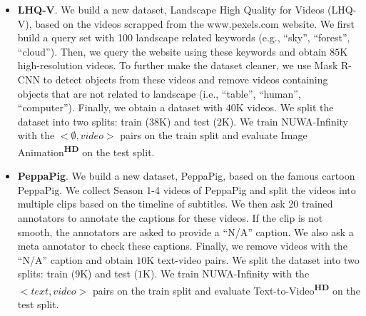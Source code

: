 \documentclass{article}
\begin{document}
\begin{itemize}[leftmargin=*]
\item \textbf{LHQ-V}. We build a new dataset, Landscape High Quality for Videos (LHQ-V), based on the videos scrapped from the www.pexels.com website. We first build a query set with 100 landscape related keywords (e.g., ``sky'', ``forest'', ``cloud''). Then, we query the website using these keywords and obtain $85$K high-resolution videos. To further make the dataset cleaner, we use Mask R-CNN \cite{heMaskRCNN2017} to detect objects from these videos and remove videos containing objects that are not related to landscape (i.e., ``table'', ``human'', ``computer''). Finally, we obtain a dataset with $40$K videos. We split the dataset into two splits: train ($38$K) and test ($2$K). We train NUWA-Infinity with the $<\emptyset, video>$ pairs on the train split and evaluate Image Animation\textsuperscript{\textbf{HD}} on the test split.

\item \textbf{PeppaPig}. We build a new dataset, PeppaPig, based on the famous cartoon PeppaPig. We collect Season 1-4 videos of PeppaPig and split the videos into multiple clips based on the timeline of subtitles. We then ask 20 trained annotators to annotate the captions for these videos. If the clip is not smooth, the annotators are asked to provide a ``N/A'' caption. We also ask a meta annotator to check these captions. Finally, we remove videos with the ``N/A'' caption and obtain $10$K text-video pairs. We split the dataset into two splits: train ($9$K) and test ($1$K). We train NUWA-Infinity with the $<text, video>$ pairs on the train split and evaluate Text-to-Video\textsuperscript{\textbf{HD}} on the test split.
\end{itemize}
\end{document}
